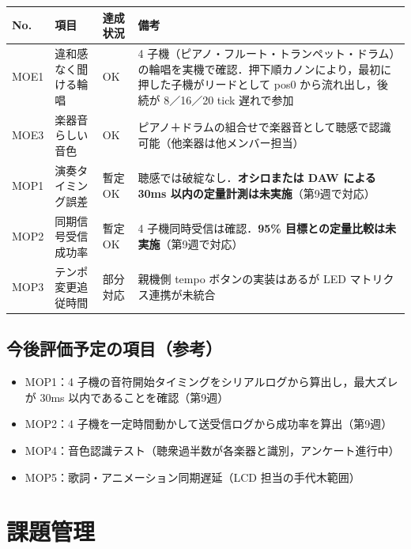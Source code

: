 \documentclass[a4paper,11pt]{ltjsarticle}
\providecommand{\％}{\%}
\begin{document}
\begingroup
\setlength{\tabcolsep}{3pt}
\sloppy
\begin{longtable}{|p{1.0cm}|p{2.8cm}|p{1.8cm}|p{8.7cm}|}
\hline
\rowcolor[gray]{0.9}
No. & 項目 & 達成状況 & 備考 \\
\hline
MOE1 & 違和感なく聞ける輪唱 & OK & 4 子機（ピアノ・フルート・トランペット・ドラム）の輪唱を実機で確認．押下順カノンにより，最初に押した子機がリードとして pos0 から流れ出し，後続が 8／16／20 tick 遅れで参加 \\
\hline
MOE3 & 楽器音らしい音色 & OK & ピアノ＋ドラムの組合せで楽器音として聴感で認識可能（他楽器は他メンバー担当） \\
\hline
MOP1 & 演奏タイミング誤差 & 暫定OK & 聴感では破綻なし．\textbf{オシロまたは DAW による 30ms 以内の定量計測は未実施}（第9週で対応） \\
\hline
MOP2 & 同期信号受信成功率 & 暫定OK & 4 子機同時受信は確認．\textbf{95\% 目標との定量比較は未実施}（第9週で対応） \\
\hline
MOP3 & テンポ変更追従時間 & 部分対応 & 親機側 tempo ボタンの実装はあるが LED マトリクス連携が未統合 \\
\hline
\end{longtable}
\endgroup

\subsection{今後評価予定の項目（参考）}\label{sec:futureplan}

\begin{itemize}
    \item MOP1：4 子機の音符開始タイミングをシリアルログから算出し，最大ズレが 30ms 以内であることを確認（第9週）
    \item MOP2：4 子機を一定時間動かして送受信ログから成功率を算出（第9週）
    \item MOP4：音色認識テスト（聴衆過半数が各楽器と識別，アンケート進行中）
    \item MOP5：歌詞・アニメーション同期遅延（LCD 担当の手代木範囲）
\end{itemize}

\section{課題管理}\label{sec:issues}
\end{document}

